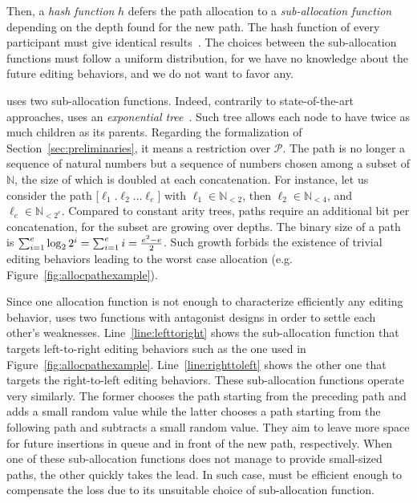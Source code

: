 Then, a \emph{hash function} $h$ defers the path allocation to a \emph{sub-allocation
function} depending on the depth found for the new path. The hash function of
every participant must give identical results~\cite{nedelec2013concurrency}.
The choices between the sub-allocation functions must follow a uniform
distribution, for we have no knowledge about the future editing behaviors, and
we do not want to favor any.

\LSEQ uses two sub-allocation functions. Indeed, contrarily to state-of-the-art
approaches, \LSEQ uses an \emph{exponential
  tree}~\cite{andersson1996faster,andersson2007dynamic}. Such tree allows each
node to have twice as much children as its parents. Regarding the formalization
of Section~\ref{sec:preliminaries}, it means a restriction over
$\mathcal{P}$. The path is no longer a sequence of natural numbers but a
sequence of numbers chosen among a subset of $\mathbb{N}$, the size of which is
doubled at each concatenation. For instance, let us consider the path
[$\ell_1.\ell_2\ldots\ell_e$] with $\ell_1\in\mathbb{N}_{<2}$, then
$\ell_2\in \mathbb{N}_{<4}$, and $\ell_{e}\in\mathbb{N}_{<2^e}$. Compared to
constant arity trees, paths require an additional bit per concatenation, for the
subset are growing over depths. The binary size of a path is
$\textstyle\sum\nolimits_{i=1}^{e}\log_2{2^i}=\sum\nolimits_{i=1}^{e}i=
{e^2-e\over{2}}$.
Such growth forbids the existence of trivial editing behaviors leading to the
worst case allocation (e.g. Figure~\ref{fig:allocpathexample}).

Since one allocation function is not enough to characterize efficiently any
editing behavior, \LSEQ uses two functions with antagonist designs in order to
settle each other's weaknesses. Line~\ref{line:lefttoright} shows the
sub-allocation function that targets left-to-right editing behaviors such as the
one used in Figure~\ref{fig:allocpathexample}. Line~\ref{line:righttoleft} shows
the other one that targets the right-to-left editing behaviors. These
sub-allocation functions operate very similarly. The former chooses the
path starting from the preceding path and adds a small random value while the
latter chooses a path starting from the following path and subtracts a small
random value. They aim to leave more space for future insertions in queue and in
front of the new path, respectively.  When one of these sub-allocation functions
does not manage to provide small-sized paths, the other quickly takes the lead. In
such case, \LSEQ must be efficient enough to compensate the loss due to its
unsuitable choice of sub-allocation function.


